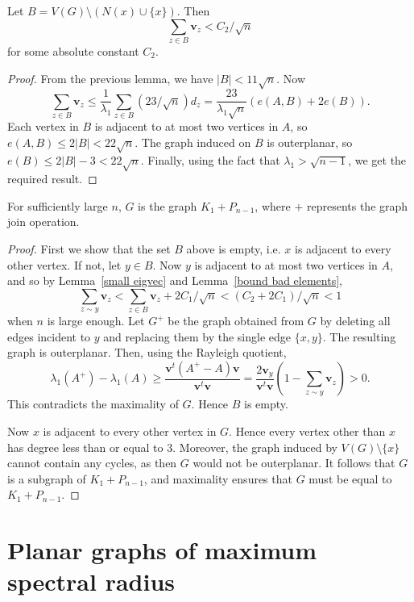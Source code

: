 \begin{lemma}\label{bound bad elements}
 Let $B = V(G) \setminus (N(x) \cup \{x\})$.  Then
  \[ \sum_{z \in B} \mathbf{v}_z < C_2 / \sqrt{n} \]
 for some absolute constant $C_2$.
\end{lemma}
\begin{proof}
From the previous lemma, we have $|B| < 11 \sqrt{n}$.  Now
 \[ \sum_{z \in B} \mathbf{v}_z \leq \frac{1}{\lambda_1} \sum_{z \in B} \left(23 / \sqrt{n}\right) d_z = \frac{23}{\lambda_1 \sqrt{n}} \left( e(A,B) + 2 e(B)\right) . \]
Each vertex in $B$ is adjacent to at most two vertices in $A$, so $e(A,B) \leq 2 |B| < 22 \sqrt{n}$.  The graph induced on $B$ is outerplanar, so
$e(B) \leq 2|B| - 3 < 22 \sqrt{n}$.  Finally, using the fact that $\lambda_1 > \sqrt{n-1}$, we get the required result.
\end{proof}

\begin{theorem}
 For sufficiently large $n$, $G$ is the graph $K_1 + P_{n-1}$, where $+$ represents the graph join operation.
\end{theorem}
\begin{proof}
First we show that the set $B$ above is empty, i.e. $x$ is adjacent
to every other vertex.  If not, let $y \in B$.  Now $y$ is adjacent to at
most two vertices in $A$, and so by Lemma~\ref{small eigvec} and Lemma~\ref{bound bad elements}, 
 \[ \sum_{z \sim y} \mathbf{v}_z < \sum_{z \in B} \mathbf{v}_z + 2 C_1 / \sqrt{n} < (C_2 + 2 C_1) / \sqrt{n} < 1\]
when $n$ is large enough.  Let $G^+$ be the graph obtained
from $G$ by deleting all edges incident to $y$ and replacing them by the single edge $\{x,y\}$.  The resulting graph is outerplanar.  Then,
using the Rayleigh quotient,
 \[ \lambda_1(A^+) - \lambda_1(A) \geq \frac{\textbf{v}^t(A^+ - A)\textbf{v}}{\textbf{v}^t\textbf{v}} = \frac{2\mathbf{v}_y}{\textbf{v}^t\textbf{v}} \left(1 - \sum_{z \sim y} \mathbf{v}_z\right) > 0.\]
This contradicts the maximality of $G$.  Hence $B$ is empty.


Now $x$ is adjacent to every other vertex in $G$.  Hence every vertex other than $x$ has degree less than or equal to $3$.  Moreover, the graph induced by 
$V(G) \setminus \{x\}$ cannot contain any cycles, as then $G$ would not be outerplanar.
It follows that $G$ is a subgraph of $K_1 + P_{n-1}$, and maximality ensures that $G$ must be equal to $K_1 + P_{n-1}$.
\end{proof}


\section{Planar graphs of maximum spectral radius}\label{planar}

